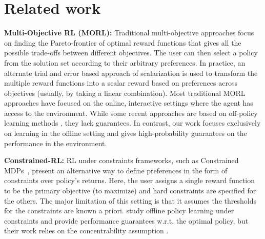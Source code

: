 \section{Related work}
\label{sec:related-work}



\textbf{Multi-Objective RL (MORL):}
Traditional multi-objective approaches \citep{mannor2004geometric, roijers2013survey, liu2014multiobjective} focus on finding the Pareto-frontier of optimal reward functions that gives all the possible trade-offs between different objectives. The user can then select a policy from the solution set according to their arbitrary preferences. In practice, an alternate trial and error based approach of scalarization is used to transform the multiple reward functions into a scalar reward based on preferences across objectives (usually, by taking a linear combination). 
Most traditional MORL approaches have focused on the online, interactive settings where the agent has access to the environment. While some recent approaches are based on off-policy learning methods \citep{lizotte2012linear, van2014multi,yang2019generalized,abdolmaleki2020distributional}, they lack guarantees. In contrast, our work focuses exclusively on learning in the offline setting and gives high-probability guarantees on the performance in the environment.

\textbf{Constrained-RL:} 
RL under constraints frameworks, such as Constrained MDPs~\citep[CMDPs,][]{altman1999constrained}, present an alternative way to define preferences in the form of constraints over policy's returns. 
Here, the user assigns a single reward function to be the primary objective (to maximize) and hard constraints are specified for the others.
The major limitation of this setting is that it assumes the thresholds for the constraints are known a priori. 
%
\citet{le2019batch} study offline policy learning under constraints
and provide performance guarantees w.r.t. the optimal policy, but their work relies on the concentrability assumption \citep{munos2003error}.


